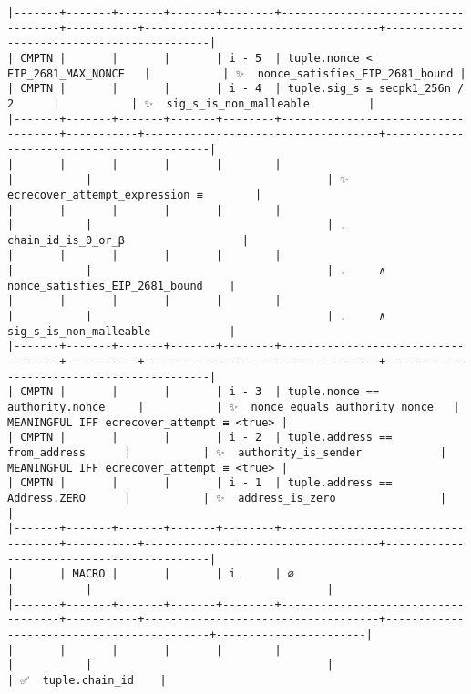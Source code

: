 \documentclass[varwidth=\maxdimen,margin=0.5cm,multi={verbatim}]{standalone}
\begin{document}
\begin{verbatim}
|-------+-------+-------+-------+--------+------------------------------------+-----------+------------------------------------+-------------------------------------------|
| CMPTN |       |       |       | i - 5  | tuple.nonce < EIP_2681_MAX_NONCE   |           | ✨  nonce_satisfies_EIP_2681_bound |
| CMPTN |       |       |       | i - 4  | tuple.sig_s ≤ secpk1_256n / 2      |           | ✨  sig_s_is_non_malleable         |
|-------+-------+-------+-------+--------+------------------------------------+-----------+------------------------------------+-------------------------------------------|
|       |       |       |       |        |                                    |           |                                    | ✨  ecrecover_attempt_expression ≡        |
|       |       |       |       |        |                                    |           |                                    | .     chain_id_is_0_or_β                  |
|       |       |       |       |        |                                    |           |                                    | .     ∧ nonce_satisfies_EIP_2681_bound    |
|       |       |       |       |        |                                    |           |                                    | .     ∧ sig_s_is_non_malleable            |
|-------+-------+-------+-------+--------+------------------------------------+-----------+------------------------------------+-------------------------------------------|
| CMPTN |       |       |       | i - 3  | tuple.nonce == authority.nonce     |           | ✨  nonce_equals_authority_nonce   | MEANINGFUL IFF ecrecover_attempt ≡ <true> |
| CMPTN |       |       |       | i - 2  | tuple.address == from_address      |           | ✨  authority_is_sender            | MEANINGFUL IFF ecrecover_attempt ≡ <true> |
| CMPTN |       |       |       | i - 1  | tuple.address == Address.ZERO      |           | ✨  address_is_zero                |                                           |
|-------+-------+-------+-------+--------+------------------------------------+-----------+------------------------------------+-------------------------------------------|
|       | MACRO |       |       | i      | ∅                                  |           |                                    |
|-------+-------+-------+-------+--------+------------------------------------+-----------+------------------------------------+-------------------------------------------+-----------------------|
|       |       |       |       |        |                                    |           |                                    |                                           | ✅  tuple.chain_id    |

\end{verbatim}
\end{document}
